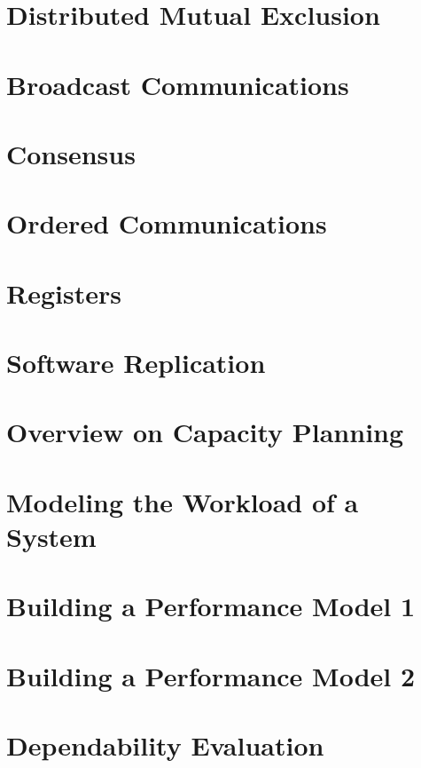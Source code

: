 	\newpage
	\section{Distributed Mutual Exclusion}
	
	\newpage
	\section{Broadcast Communications}
	
	\newpage
	\section{Consensus}
	
	\newpage
	\section{Ordered Communications}
	
	\newpage
	\section{Registers}
	
	\newpage
	\section{Software Replication}
	
	\newpage
	\section{Overview on Capacity Planning}
	
	\newpage
	\section{Modeling the Workload of a System}
	
	\newpage
	\section{Building a Performance Model 1}
	
	\newpage
	\section{Building a Performance Model 2}
	
	\newpage
	\section{Dependability Evaluation}
	
